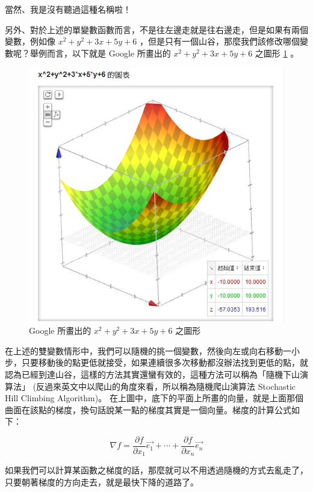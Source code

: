 \documentclass{article}
\begin{document}
當然、我是沒有聽過這種名稱啦！

另外、對於上述的單變數函數而言，不是往左邊走就是往右邊走，但是如果有兩個變數，例如像  $x^2+y^2+3x+5y+6$  ，但是只有一個山谷，那麼我們該修改哪個變數呢？舉例而言，以下就是 Google 所畫出的  $x^2+y^2+3x+5y+6$  之圖形  \ref{fig:curve3} 。

\begin{figure}
  \includegraphics[width=\linewidth]{img/GoogleGraph3D.jpg}
  \caption{Google 所畫出的 $x^2+y^2+3x+5y+6$  之圖形}
  \label{fig:curve3}
\end{figure}


在上述的雙變數情形中，我們可以隨機的挑一個變數，然後向左或向右移動一小步，只要移動後的點更低就接受，如果連續很多次移動都沒辦法找到更低的點，就認為已經到達山谷，這樣的方法其實還蠻有效的，這種方法可以稱為「隨機下山演算法」 (反過來英文中以爬山的角度來看，所以稱為隨機爬山演算法 Stochastic Hill Climbing Algorithm)。
在上圖中，底下的平面上所畫的向量，就是上面那個曲面在該點的梯度，換句話說某一點的梯度其實是一個向量。梯度的計算公式如下：


\begin{equation}
\nabla f  = \frac{\partial f}{\partial x_1 }\vec{e_1} + \cdots + \frac{\partial f}{\partial x_n }\vec{e_n}
\end{equation}


如果我們可以計算某函數之梯度的話，那麼就可以不用透過隨機的方式去亂走了，只要朝著梯度的方向走去，就是最快下降的道路了。
\end{document}
